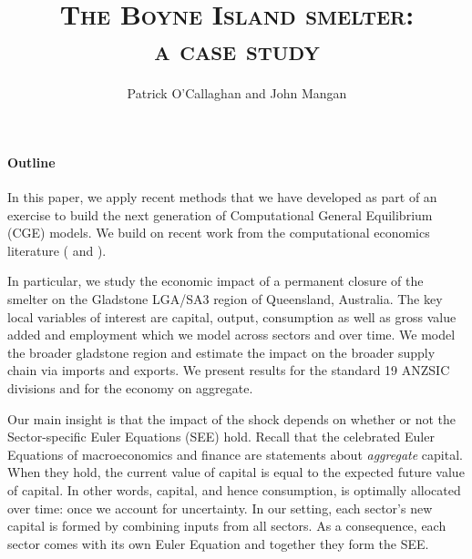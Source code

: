 \documentclass[12pt,a4paper]{article}
\title{\textsc{The Boyne Island smelter:\\
  a case study}}
\author{\small Patrick O’Callaghan and John Mangan}
\begin{document}
\maketitle


\paragraph{Outline}
In this paper, we apply recent methods that we have developed as part of an
exercise to build the next generation of Computational General Equilibrium
(CGE) models.  We build on recent work from the computational economics
literature (\cite{CJ} and \cite{Atalay}).

In particular, we study the economic impact of a permanent closure of the
smelter on the Gladstone LGA/SA3 region of Queensland, Australia. The key local
variables of interest are capital, output, consumption as well as gross value
added and employment which we model across sectors and over time. We model the
broader gladstone region and estimate the impact on the broader supply chain
via imports and exports. We present results for the standard 19 ANZSIC
divisions and for the economy on aggregate.

Our main insight is that the impact of the shock depends on whether or not the
Sector-specific Euler Equations (SEE) hold. Recall that the celebrated Euler
Equations of macroeconomics and finance are statements about \emph{aggregate}
capital.  When they hold, the current value of capital is equal to the expected
future value of capital. In other words, capital, and hence consumption, is
optimally allocated over time: once we account for uncertainty. In our setting,
each sector's new capital is formed by combining inputs from all sectors. As a
consequence, each sector comes with its own Euler Equation and together they
form the SEE.
\end{document}
